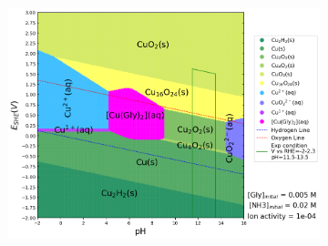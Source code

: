 \documentclass[journal=jacsat,manuscript=article]{achemso}
\begin{document}
\begin{figure}[htbp]
\begin{subfigure}[b]{0.3\textwidth}
    \end{subfigure}
    \begin{subfigure}[b]{0.3\textwidth}
        \subcaption{}\label{fig:Cu_Pourbaix}
        \includegraphics[width=\textwidth]{Figures/pourbaix_diagrams/Cu-NH3-H2O_activity=1e-04_[NH3]=0.02M_[Gly]=0.005M_[CN]=0.png}
        

\end{subfigure}
\end{figure}
\end{document}
